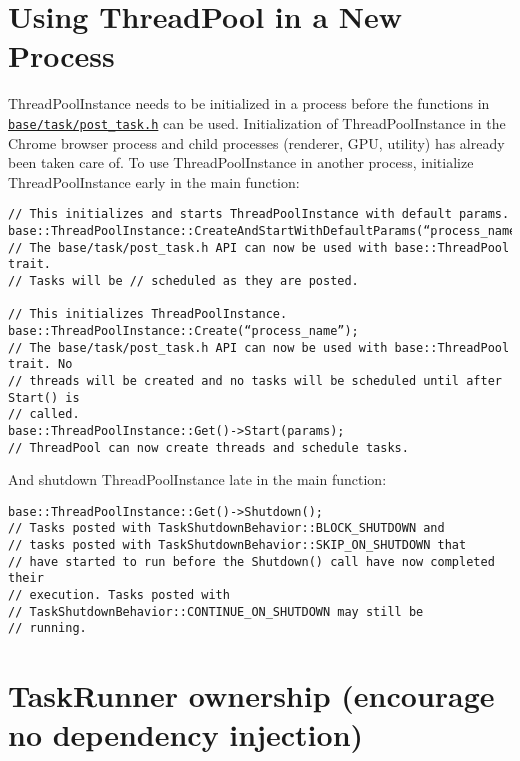 \documentclass[a4paper,12pt,notitlepage,twoside,openright]{article}
\begin{document}
\hypertarget{using-threadpool-in-a-new-process}{%
\section{Using ThreadPool in a New
Process}\label{using-threadpool-in-a-new-process}}

ThreadPoolInstance needs to be initialized in a process before the
functions in
\href{https://cs.chromium.org/chromium/src/base/task/post_task.h}{\texttt{base/task/post\_task.h}}
can be used. Initialization of ThreadPoolInstance in the Chrome browser
process and child processes (renderer, GPU, utility) has already been
taken care of. To use ThreadPoolInstance in another process, initialize
ThreadPoolInstance early in the main function:

\begin{verbatim}
// This initializes and starts ThreadPoolInstance with default params.
base::ThreadPoolInstance::CreateAndStartWithDefaultParams(“process_name”);
// The base/task/post_task.h API can now be used with base::ThreadPool trait.
// Tasks will be // scheduled as they are posted.

// This initializes ThreadPoolInstance.
base::ThreadPoolInstance::Create(“process_name”);
// The base/task/post_task.h API can now be used with base::ThreadPool trait. No
// threads will be created and no tasks will be scheduled until after Start() is
// called.
base::ThreadPoolInstance::Get()->Start(params);
// ThreadPool can now create threads and schedule tasks.
\end{verbatim}

And shutdown ThreadPoolInstance late in the main function:

\begin{verbatim}
base::ThreadPoolInstance::Get()->Shutdown();
// Tasks posted with TaskShutdownBehavior::BLOCK_SHUTDOWN and
// tasks posted with TaskShutdownBehavior::SKIP_ON_SHUTDOWN that
// have started to run before the Shutdown() call have now completed their
// execution. Tasks posted with
// TaskShutdownBehavior::CONTINUE_ON_SHUTDOWN may still be
// running.
\end{verbatim}

\hypertarget{taskrunner-ownership-encourage-no-dependency-injection}{%
\section{TaskRunner ownership (encourage no dependency
injection)}\label{taskrunner-ownership-encourage-no-dependency-injection}}
\end{document}
